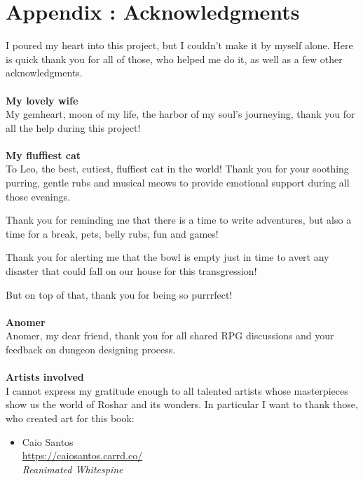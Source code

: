 \chapter{Appendix \thechapter{}: Acknowledgments}
\label{chap:acknowledgments}

I poured my heart into this project, but I couldn't make it by myself alone. Here is quick thank you for all of those, who helped me do it, as well as a few other acknowledgments. \\ \\


\noindent\textbf{\Large My lovely wife} \\

My gemheart, moon of my life, the harbor of my soul’s journeying, thank you for all the help during this project! \\ \\


\noindent\textbf{\Large My fluffiest cat} \\

To Leo, the best, cutiest, fluffiest cat in the world! Thank you for your soothing purring, gentle rubs and musical meows to provide emotional support during all those evenings.

Thank you for reminding me that there is a time to write adventures, but also a time for a break, pets, belly rubs, fun and games!

Thank you for alerting me that the bowl is empty just in time to avert any disaster that could fall on our house for this transgression!

But on top of that, thank you for being so purrrfect! \\ \\


\noindent\textbf{\Large Anomer} \\

Anomer, my dear friend, thank you for all shared RPG discussions and your feedback on dungeon designing process.\\ \\


\newpage
\noindent\textbf{\Large Artists involved} \\

I cannot express my gratitude enough to all talented artists whose masterpieces show us the world of Roshar and its wonders. In particular I want to thank those, who created art for this book:

\begin{itemize}	
	\item Caio Santos \\
	\url{https://caiosantos.carrd.co/} \\
	\textit{Reanimated Whitespine}
\end{itemize}

